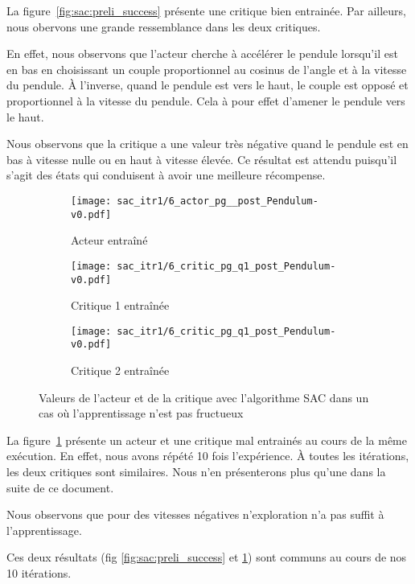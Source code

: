 La figure~\ref{fig:sac:preli_success} présente une critique bien entrainée. Par
ailleurs, nous obervons une grande ressemblance dans les deux critiques.

En effet, nous observons que l'acteur cherche à accélérer le pendule lorsqu'il
est en bas en choisissant un couple proportionnel au cosinus de l'angle et à la
vitesse du pendule. À l'inverse, quand le pendule est vers le haut, le couple
est opposé et proportionnel à la vitesse du pendule. Cela à pour effet d'amener
le pendule vers le haut.

Nous observons que la critique a une valeur très négative quand le pendule est
en bas à vitesse nulle ou en haut à vitesse élevée. Ce résultat est attendu
puisqu'il s'agit des états qui conduisent à avoir une meilleure récompense.

\begin{figure}[H]
    \centering
    \begin{subfigure}{0.3\textwidth}
        \texttt{[image: sac\_itr1/6\_actor\_pg\_\_post\_Pendulum-v0.pdf]}
        \caption{Acteur entraîné}
    \end{subfigure}
    \begin{subfigure}{0.3\textwidth}
        \texttt{[image: sac\_itr1/6\_critic\_pg\_q1\_post\_Pendulum-v0.pdf]}
        \caption{Critique 1 entraînée}
    \end{subfigure}
    \begin{subfigure}{0.3\textwidth}
        \texttt{[image: sac\_itr1/6\_critic\_pg\_q1\_post\_Pendulum-v0.pdf]}
        \caption{Critique 2 entraînée}
    \end{subfigure}
    \caption{Valeurs de l'acteur et de la critique avec l'algorithme SAC dans un cas où l'apprentissage n'est pas fructueux}\label{fig:sac:preli_failed}
\end{figure}

La figure~\ref{fig:sac:preli_failed} présente un acteur et une critique mal
entrainés au cours de la même exécution. En effet, nous avons répété 10 fois
l'expérience. À toutes les itérations, les deux critiques sont similaires. Nous
n'en présenterons plus qu'une dans la suite de ce document.

Nous observons que pour des vitesses négatives n'exploration n'a pas suffit à l'apprentissage.

Ces deux résultats (fig \ref{fig:sac:preli_success} et \ref{fig:sac:preli_failed}) sont communs au cours de nos 10 itérations.

